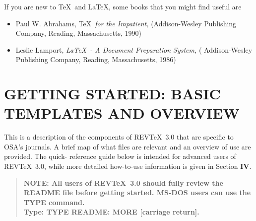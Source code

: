      If you are new to \TeX\ and \LaTeX, some books that you might
find useful are
\begin{itemize}
\item     Paul W. Abrahams, {\TeX\  \it  for the Impatient,}
          (Addison-Wesley Publishing Company, Reading,
          Massachusetts, 1990)

\item     Leslie Lamport, {\it \LaTeX\ - A Document Preparation System,}
          ( Addison-Wesley Publishing
          Company, Reading, Massachusetts, 1986)
\end{itemize}



\section{ GETTING STARTED:  BASIC TEMPLATES AND OVERVIEW}

     This is a description of the components of REV\TeX\ 3.0 that
are specific to OSA's journals.  A brief map of what files are
relevant and an overview of use are provided.  The quick-
reference guide below is intended for advanced users of REV\TeX\
3.0, while more detailed how-to-use information is given in
Section {\bf IV}.
\begin{quote}
        {\bf   NOTE:  All users of REV\TeX\ 3.0
should fully review the README  file before getting started. MS-DOS
users can use the TYPE command.\\
               Type: TYPE README: MORE [carriage return]. } \\
\end{quote}

